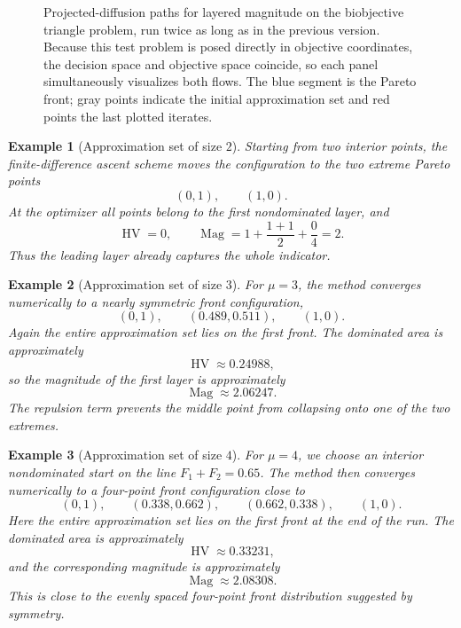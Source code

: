 \documentclass{article}
\newtheorem{example}{Example}
\newcommand{\Mag}{\operatorname{Mag}}
\newcommand{\HV}{\operatorname{HV}}
\begin{document}
\begin{figure}[t]
\caption{Projected-diffusion paths for layered magnitude on the biobjective triangle problem, run twice as long as in the previous version. Because this test problem is posed directly in objective coordinates, the decision space and objective space coincide, so each panel simultaneously visualizes both flows. The blue segment is the Pareto front; gray points indicate the initial approximation set and red points the last plotted iterates.}
\label{fig:three-examples}
\end{figure}

\begin{example}[Approximation set of size $2$]
Starting from two interior points, the finite-difference ascent scheme moves the configuration to the two extreme Pareto points
\[
(0,1),\qquad (1,0).
\]
At the optimizer all points belong to the first nondominated layer, and
\[
\HV=0,
\qquad
\Mag=1+\frac{1+1}{2}+\frac{0}{4}=2.
\]
Thus the leading layer already captures the whole indicator.
\end{example}

\begin{example}[Approximation set of size $3$]
For $\mu=3$, the method converges numerically to a nearly symmetric front configuration,
\[
(0,1),\qquad (0.489,0.511),\qquad (1,0).
\]
Again the entire approximation set lies on the first front. The dominated area is approximately
\[
\HV\approx 0.24988,
\]
so the magnitude of the first layer is approximately
\[
\Mag\approx 2.06247.
\]
The repulsion term prevents the middle point from collapsing onto one of the two extremes.
\end{example}

\begin{example}[Approximation set of size $4$]
For $\mu=4$, we choose an interior nondominated start on the line $F_1+F_2=0.65$. The method then converges numerically to a four-point front configuration close to
\[
(0,1),\qquad (0.338,0.662),\qquad (0.662,0.338),\qquad (1,0).
\]
Here the entire approximation set lies on the first front at the end of the run. The dominated area is approximately
\[
\HV\approx 0.33231,
\]
and the corresponding magnitude is approximately
\[
\Mag\approx 2.08308.
\]
This is close to the evenly spaced four-point front distribution suggested by symmetry.
\end{example}
\end{document}
